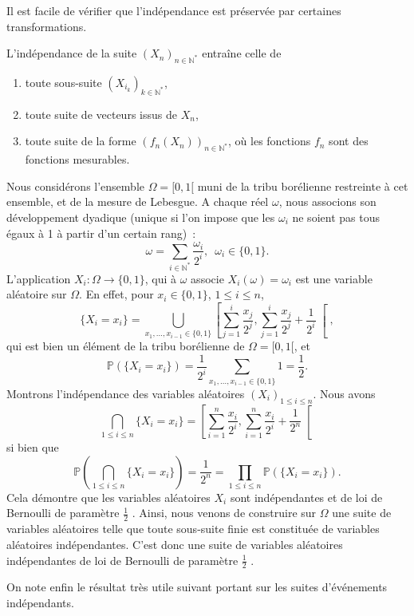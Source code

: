 Il est facile de vérifier que l'indépendance est préservée par certaines
transformations.

\begin{proposition}[{Conséquences}]\label{IV-consuxe9quences}

L'indépendance de la suite \((X_n)_{n\in \mathbb{N}^\ast}\) entraîne
celle de

\begin{enumerate}
\def\labelenumi{\arabic{enumi}.}
\tightlist
\item
  toute sous-suite \((X_{i_k})_{k\in \mathbb{N}^\ast}\),
\item
  toute suite de vecteurs issus de \(X_n\),
\item
  toute suite de la forme \((f_n(X_n))_{n\in \mathbb{N}^\ast}\), où les
  fonctions \(f_n\) sont des fonctions mesurables.
\end{enumerate}
\end{proposition}

\begin{exemple}\label{IV-duxe9veloppement-dyadique}

Nous considérons l'ensemble \(\Omega = [0, 1[\) muni de la tribu
borélienne restreinte à cet ensemble, et de la mesure de Lebesgue. A
chaque réel \(\omega\), nous associons son développement dyadique
(unique si l'on impose que les \(\omega_i\) ne soient pas tous égaux à 1
à partir d'un certain rang)~:
\[ \omega = \sum_{i\in \mathbb{N}^\ast} \frac{\omega_i}{2^i},\,\,\, \omega_i \in \{0,1\}.\]
L'application \(X_i : \Omega \to \{0,1\}\), qui à \(\omega\) associe
\(X_i(\omega) = \omega_i\) est une variable aléatoire sur \(\Omega\). En
effet, pour \(x_i \in \{0,1\}\), \(1\leq i \leq n\),
\[ \{X_i = x_i\} = \bigcup_{x_1,\ldots, x_{i-1} \in \{0,1\}} \left[ \sum_{j=1}^i \frac{x_j}{2^j}, \sum_{j=1}^i \frac{x_j}{2^j} + \frac{1}{2^i}\right[, \]
qui est bien un élément de la tribu borélienne de \(\Omega = [0,1[\), et
\[\mathbb{P}(\{X_i = x_i\}) = \frac{1}{2^i} \sum_{x_1,\ldots, x_{i-1} \in \{0,1\}} 1 = \frac{1}{2}.\]
Montrons l'indépendance des variables aléatoires
\((X_i)_{1\leq i \leq n}\). Nous avons
\[ \bigcap_{1\leq i \leq n} \{X_i = x_i\} = \left[ \sum_{i=1}^n \frac{x_i}{2^i}, \sum_{i=1}^n \frac{x_i}{2^i} + \frac{1}{2^n}\right[ \]
si bien que
\[ \mathbb{P}\left(\bigcap_{1\leq i \leq n} \{X_i = x_i\}\right) = \frac{1}{2^n} = \prod_{1\leq i \leq n} \mathbb{P}(\{X_i = x_i\}).\]
Cela démontre que les variables aléatoires \(X_i\) sont indépendantes et
de loi de Bernoulli de paramètre \(\frac{1}{2}\) . Ainsi, nous venons de
construire sur \(\Omega\) une suite de variables aléatoires telle que
toute sous-suite finie est constituée de variables aléatoires
indépendantes. C'est donc une suite de variables aléatoires
indépendantes de loi de Bernoulli de paramètre \(\frac{1}{2}\) .

On note enfin le résultat très utile suivant portant sur les suites
d'événements indépendants.
\end{exemple}

